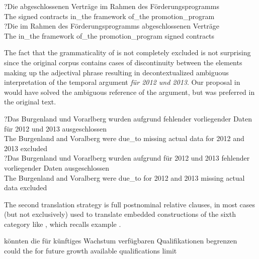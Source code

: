 \documentclass[output=paper,colorlinks,citecolor=brown]{langscibook}
\begin{document}
  \ea \label{ex:resi:35a}
  \gll ?Die  abgeschlossenen  Verträge  im  Rahmen  des  Förderungsprogramms\\
    The  signed  contracts       in\_the  framework  of\_the  promotion\_program\\
  \ex \label{ex:resi:35b}
  \gll ?Die  im  Rahmen  des  Förderungsprogramms  abgeschlossenen  Verträge\\
    The  in\_the  framework  of\_the  promotion\_program  signed  contracts\\
  \z
\z

The fact that the grammaticality of  is not completely excluded is not surprising since the original corpus contains cases of discontinuity between the elements making up the adjectival phrase  resulting in decontextualized ambiguous interpretation of the temporal argument \textit{für 2012 und 2013}. Our proposal in  would have solved the ambiguous reference of the argument, but  was preferred in the original text.

\ea%
    
\ea \label{ex:resi:36a} \gll ?Das  Burgenland  und  Vorarlberg  wurden  aufgrund  fehlender   vorliegender  Daten  für  2012  und  2013  ausgeschlossen   \\
     The  Burgenland  and  Voralberg  were  due\_to  missing     actual              data  for  2012  and  2013  excluded   \\

  \ex  \label{ex:resi:36b}
  \gll ?Das  Burgenland  und  Vorarlberg  wurden  aufgrund  für  2012  und  2013  fehlender  vorliegender  Daten  ausgeschlossen      \\
        The  Burgenland  and  Voralberg  were  due\_to  for  2012  and  2013   missing  actual  data  excluded              \\
  \z
\z

The second translation strategy is full postnominal relative clauses, in most cases (but not exclusively) used to translate embedded constructions of the sixth category like , which recalls example .

\ea%
    \label{ex:resi:37}
\ea \gll könnten  die  für  künftiges  Wachstum  verfügbaren  Qualifikationen  begrenzen \\
     could  the  for  future  growth  available  qualifications  limit  \\
     
\end{document}
